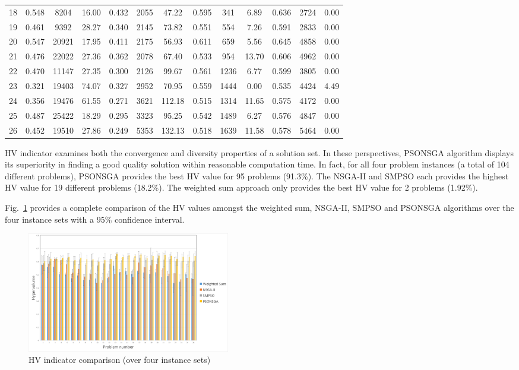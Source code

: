\documentclass[10pt,journal,compsoc]{IEEEtran}
\newcommand{\Fig}[1]{Fig.~\ref{#1}}
\begin{document}
\begin{table}[ht]
{\begin{tabular}{|*{13}{c|}}
18&0.548&8204&16.00&0.432&2055&47.22&0.595&341&6.89&0.636&2724&0.00\\
19&0.461&9392&28.27&0.340&2145&73.82&0.551&554&7.26&0.591&2833&0.00\\
20&0.547&20921&17.95&0.411&2175&56.93&0.611&659&5.56&0.645&4858&0.00\\
21&0.476&22022&27.36&0.362&2078&67.40&0.533&954&13.70&0.606&4962&0.00\\
22&0.470&11147&27.35&0.300&2126&99.67&0.561&1236&6.77&0.599&3805&0.00\\
23&0.321&19403&74.07&0.327&2952&70.95&0.559&1444&0.00&0.535&4424&4.49\\
24&0.356&19476&61.55&0.271&3621&112.18&0.515&1314&11.65&0.575&4172&0.00\\
25&0.487&25422&18.29&0.295&3323&95.25&0.542&1489&6.27&0.576&4847&0.00\\
26&0.452&19510&27.86&0.249&5353&132.13&0.518&1639&11.58&0.578&5464&0.00\\

\hline

\hline
\end{tabular}}
\end{table}
\fi
HV indicator examines both the convergence and diversity properties of a solution set. In these perspectives, PSONSGA algorithm displays its superiority in finding a good quality solution within reasonable computation time. In fact, for all four problem instances (a total of 104 different problems), PSONSGA provides the best HV value for 95 problems (91.3\%). The NSGA-II and SMPSO each provides the highest HV value for 19 different problems (18.2\%). The weighted sum approach only provides the best HV value for 2 problems (1.92\%).

\Fig{hvaverage} provides a complete comparison of the HV values amongst the weighted sum, NSGA-II, SMPSO and PSONSGA algorithms over the four instance sets with a 95\% confidence interval.

\begin{figure}[ht]
\centerline{\includegraphics[page=1,width=3.5in]{hvaverageoverfour.png}}
\caption{HV indicator comparison (over four instance sets)} 
\label{hvaverage}
\end{figure}
\end{document}

